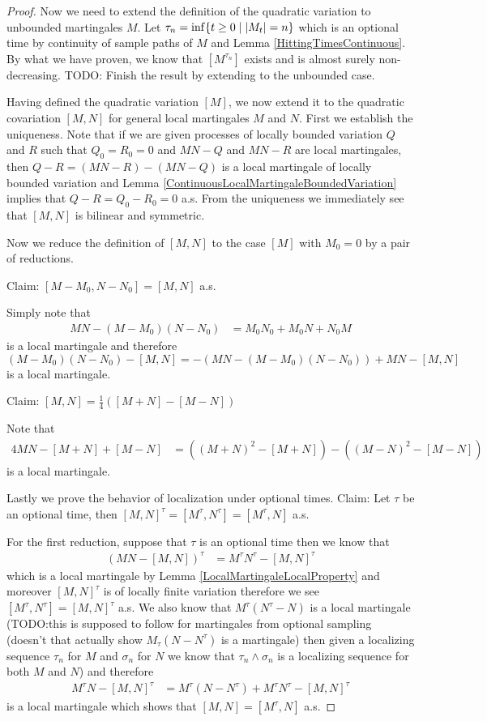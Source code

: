 \begin{proof}
Now we need to extend the definition of the quadratic variation to unbounded martingales $M$.  Let $\tau_n = \inf \lbrace t \geq 0 \mid \left \vert M_t \right \vert = n \rbrace$ which is an optional time by continuity of sample paths of $M$ and Lemma \ref{HittingTimesContinuous}.  By what we have proven, we know that $[M^{\tau_n}]$ exists and is almost surely non-decreasing.
TODO: Finish the result by extending to the unbounded case.

Having defined the quadratic variation $[M]$, we now extend it to the quadratic covariation $[M,N]$ for general local martingales $M$ and $N$.  First we establish the uniqueness.  Note that if we are given processes of locally bounded variation $Q$ and $R$ such that $Q_0 = R_0 = 0$ and $MN - Q$ and $MN - R$ are local martingales, then $Q-R = (MN -R) - (MN -Q)$ is a local martingale of locally bounded variation and Lemma \ref{ContinuousLocalMartingaleBoundedVariation} implies that $Q - R = Q_0 - R_0 = 0$ a.s.  From the uniqueness we immediately see that $[M,N]$ is bilinear and symmetric.

Now we reduce the definition of $[M,N]$ to the case $[M]$ with $M_0 = 0$ by a pair of reductions.

Claim: $[M-M_0,N-N_0] = [M,N]$ a.s.

Simply note that 
\begin{align*}
MN - (M-M_0)(N-N_0) &= M_0 N_0 + M_0 N + N_0 M
\end{align*}
is a local martingale and therefore $(M-M_0)(N-N_0) - [M,N] = -(MN - (M-M_0)(N-N_0) ) + MN - [M,N]$ is a local martingale.

Claim: $[M,N] = \frac{1}{4} ([M+N] - [M-N])$

Note that 
\begin{align*}
4 MN - [M+N] + [M-N] &= ((M+N)^2 - [M+N]) - ((M-N)^2 - [M-N])
\end{align*}
is a local martingale.

Lastly we prove the behavior of localization under optional times.
Claim: Let $\tau$ be an optional time, then $[M,N]^\tau = [M^\tau, N^\tau] = [M^\tau,N]$ a.s.

For the first reduction, suppose that $\tau$ is an optional time then we know that
\begin{align*}
(MN - [M,N])^\tau &= M^\tau N^\tau - [M,N]^\tau
\end{align*}
which is a local martingale by Lemma \ref{LocalMartingaleLocalProperty} and moreover $[M,N]^\tau$ is of locally finite variation therefore we see $[M^\tau,N^\tau] = [M,N]^\tau$ a.s.  We also know that $M^\tau (N^\tau -N)$ is a local martingale (TODO:this is supposed to follow for martingales from optional sampling (doesn't that actually show $M_\tau(N - N^\tau)$ is a martingale) then given a localizing sequence $\tau_n$ for $M$ and $\sigma_n$ for $N$ we know that $\tau_n \wedge \sigma_n$ is a localizing sequence for both $M$ and $N$) and therefore 
\begin{align*}
M^\tau N - [M,N]^\tau &= M^\tau (N - N^\tau)  + M^\tau N^\tau - [M,N]^\tau
\end{align*}
is a local martingale which shows that $[M,N]= [M^\tau,N]$ a.s.


\end{proof}
